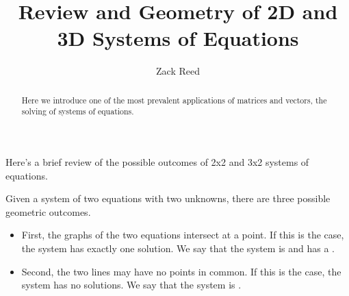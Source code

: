 \documentclass{ximera}
\author{Zack Reed} %
\title{Review and Geometry of 2D and 3D Systems of Equations}
\begin{document}
\begin{abstract}
Here we introduce one of the most prevalent applications of matrices and vectors, the solving of systems of equations.
\end{abstract}
\maketitle
    
     
    \begin{exploration}
    
      Here's a brief review of the possible outcomes of 2x2 and 3x2 systems of equations.
       
      Given a system of two equations with two unknowns, there are three possible geometric outcomes. 
      
      \begin{itemize}
          \item First, the graphs of the two equations intersect at a point.  If this is the case, the system has exactly one solution. We say that the system is  and has a . 
           
          \begin{center}
            \end{center}
          \item Second, the two lines may have no points in common.  If this is the case, the system has no solutions.  We say that the system is . 
          \begin{center}
\end{center}
\end{itemize}
\end{exploration}
\end{document}
